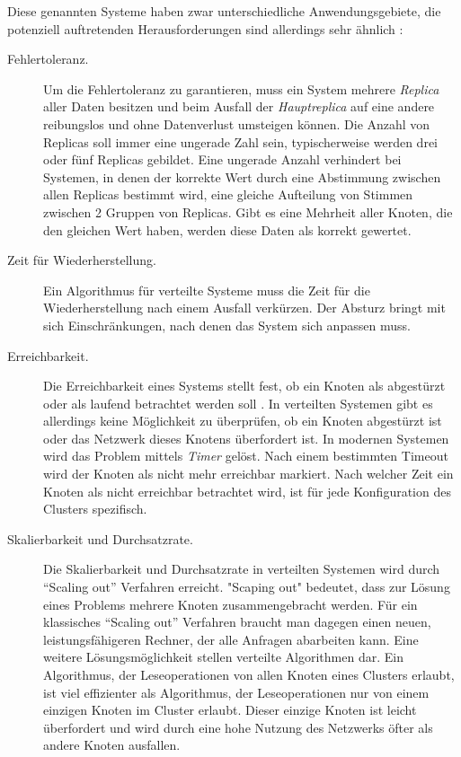 Diese genannten Systeme haben zwar unterschiedliche Anwendungsgebiete, die potenziell auftretenden Herausforderungen sind allerdings sehr ähnlich \cite{Buyya08cloudcomputing}:

\begin{description} 
	\item[Fehlertoleranz.] Um die Fehlertoleranz zu garantieren, muss ein System mehrere \textit{Replica} aller Daten besitzen und beim Ausfall der \textit{Hauptreplica} auf eine andere reibungslos und ohne Datenverlust umsteigen können. Die Anzahl von Replicas soll immer eine ungerade Zahl sein, typischerweise werden drei oder fünf Replicas gebildet. Eine ungerade Anzahl verhindert bei Systemen, in denen der korrekte Wert durch eine Abstimmung zwischen allen Replicas bestimmt wird, eine gleiche Aufteilung von Stimmen zwischen 2 Gruppen von Replicas. Gibt es eine Mehrheit aller Knoten, die den gleichen Wert haben, werden diese Daten als korrekt gewertet.
	
	\item[Zeit für Wiederherstellung.] Ein Algorithmus für verteilte Systeme muss die Zeit für die Wiederherstellung nach einem Ausfall verkürzen. Der Absturz bringt mit sich Einschränkungen, nach denen das System sich anpassen muss.
	
	\item[Erreichbarkeit.] Die Erreichbarkeit eines Systems stellt fest, ob ein Knoten als abgestürzt oder als laufend betrachtet werden soll \cite{Armbrust10aview}. In verteilten Systemen gibt es allerdings keine Möglichkeit zu überprüfen, ob ein Knoten abgestürzt ist oder das Netzwerk dieses Knotens überfordert ist. In modernen Systemen wird das Problem mittels \textit{Timer} gelöst. Nach einem bestimmten Timeout wird der Knoten als nicht mehr erreichbar markiert. Nach welcher Zeit ein Knoten als nicht erreichbar betrachtet wird, ist für jede Konfiguration des Clusters spezifisch.
	
	\item[Skalierbarkeit und Durchsatzrate.] Die Skalierbarkeit und Durchsatzrate in verteilten Systemen wird durch “Scaling out” Verfahren erreicht. "Scaping out" bedeutet, dass zur Lösung eines Problems mehrere Knoten zusammengebracht werden. Für ein klassisches “Scaling out” Verfahren braucht man dagegen einen neuen, leistungsfähigeren Rechner, der alle Anfragen abarbeiten kann. Eine weitere Lösungsmöglichkeit stellen verteilte Algorithmen dar. Ein Algorithmus, der Leseoperationen von allen Knoten eines Clusters erlaubt, ist viel effizienter als Algorithmus, der Leseoperationen nur von einem einzigen Knoten im Cluster erlaubt. Dieser einzige Knoten ist leicht überfordert und wird durch eine hohe Nutzung des Netzwerks öfter als andere Knoten ausfallen.
	

\end{description}
